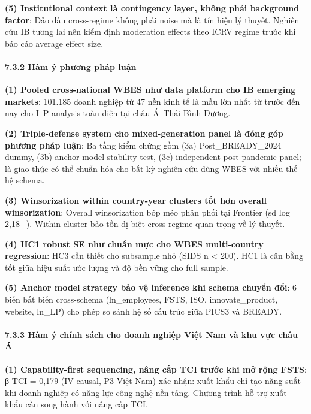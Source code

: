 \documentclass[12pt,a4paper]{article}
\begin{document}
\textbf{(5) Institutional context là contingency layer, không phải
background factor}: Đảo dấu cross-regime không phải noise mà là tín hiệu
lý thuyết. Nghiên cứu IB tương lai nên kiểm định moderation effects theo
ICRV regime trước khi báo cáo average effect size.

\hypertarget{732-huxe0m-uxfd-phux1b0ux1a1ng-phuxe1p-luux1eadn}{%
\paragraph{7.3.2 Hàm ý phương pháp
luận}\label{732-huxe0m-uxfd-phux1b0ux1a1ng-phuxe1p-luux1eadn}}

\textbf{(1) Pooled cross-national WBES như data platform cho IB emerging
markets}: 101.185 doanh nghiệp từ 47 nền kinh tế là mẫu lớn nhất từ
trước đến nay cho I--P analysis toàn diện tại châu Á--Thái Bình Dương.

\textbf{(2) Triple-defense system cho mixed-generation panel là đóng góp
phương pháp luận}: Ba tầng kiểm chứng gồm (3a) Post\_BREADY\_2024 dummy,
(3b) anchor model stability test, (3c) independent post-pandemic panel;
là giao thức có thể chuẩn hóa cho bất kỳ nghiên cứu dùng WBES với nhiều
thế hệ schema.

\textbf{(3) Winsorization within country-year clusters tốt hơn overall
winsorization}: Overall winsorization bóp méo phân phối tại Frontier (sd
log 2,18+). Within-cluster bảo tồn dị biệt cross-regime quan trọng về lý
thuyết.

\textbf{(4) HC1 robust SE như chuẩn mực cho WBES multi-country
regression}: HC3 cần thiết cho subsample nhỏ (SIDS n \textless{} 200).
HC1 là cân bằng tốt giữa hiệu suất ước lượng và độ bền vững cho full
sample.

\textbf{(5) Anchor model strategy bảo vệ inference khi schema chuyển
đổi}: 6 biến bất biến cross-schema (ln\_employees, FSTS, ISO,
innovate\_product, website, ln\_LP) cho phép so sánh hệ số cấu trúc giữa
PICS3 và BREADY.

\hypertarget{733-huxe0m-uxfd-chuxednh-suxe1ch-cho-doanh-nghiux1ec7p-viux1ec7t-nam-vuxe0-khu-vux1ef1c-chuxe2u-uxe1}{%
\paragraph{7.3.3 Hàm ý chính sách cho doanh nghiệp Việt Nam và khu vực
châu
Á}\label{733-huxe0m-uxfd-chuxednh-suxe1ch-cho-doanh-nghiux1ec7p-viux1ec7t-nam-vuxe0-khu-vux1ef1c-chuxe2u-uxe1}}

\textbf{(1) Capability-first sequencing, nâng cấp TCI trước khi mở rộng
FSTS}: β TCI = 0,179 (IV-causal, P3 Việt Nam) xác nhận: xuất khẩu chỉ
tạo năng suất khi doanh nghiệp có năng lực công nghệ nền tảng. Chương
trình hỗ trợ xuất khẩu cần song hành với nâng cấp TCI.
\end{document}
